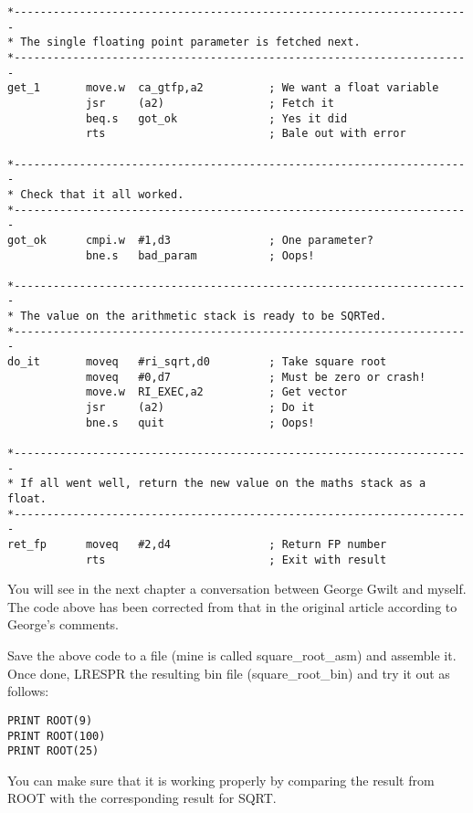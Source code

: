 \begin{lstlisting}[firstnumber=1,caption={The Maths Package - Calculate Square Roots},label={lst:MathsPackageRoot}]
*----------------------------------------------------------------------
* The single floating point parameter is fetched next.
*----------------------------------------------------------------------
get_1       move.w  ca_gtfp,a2          ; We want a float variable
            jsr     (a2)                ; Fetch it
            beq.s   got_ok              ; Yes it did
            rts                         ; Bale out with error

*----------------------------------------------------------------------
* Check that it all worked.
*----------------------------------------------------------------------
got_ok      cmpi.w  #1,d3               ; One parameter?
            bne.s   bad_param           ; Oops!

*----------------------------------------------------------------------
* The value on the arithmetic stack is ready to be SQRTed.
*----------------------------------------------------------------------
do_it       moveq   #ri_sqrt,d0         ; Take square root
            moveq   #0,d7               ; Must be zero or crash!
            move.w  RI_EXEC,a2          ; Get vector
            jsr     (a2)                ; Do it
            bne.s   quit                ; Oops!

*----------------------------------------------------------------------
* If all went well, return the new value on the maths stack as a float.
*----------------------------------------------------------------------
ret_fp      moveq   #2,d4               ; Return FP number
            rts                         ; Exit with result
\end{lstlisting}

\begin{note}
You will see in the next chapter a conversation between George
      Gwilt and myself. The code above has been corrected from that in the
      original article according to George's comments.
\end{note}

Save the above code to a file (mine is called square\_root\_asm) and
    assemble it. Once done, LRESPR the resulting bin file (square\_root\_bin)
    and try it out as follows:

\begin{lstlisting}[firstnumber=1,language={}]
PRINT ROOT(9)
PRINT ROOT(100)
PRINT ROOT(25)
\end{lstlisting}

You can make sure that it is working properly by
    comparing the result from ROOT with the corresponding result for
    SQRT.

